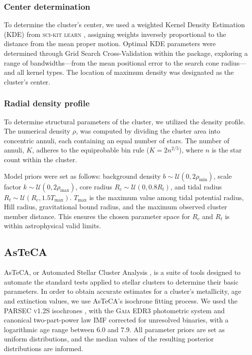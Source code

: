 \documentclass[baaa]{baaa}
\begin{document}
\subsubsection{Center determination}

To  determine the cluster's center, we used a weighted Kernel Density Estimation (KDE) from \textsc{sci-kit learn} \citep{scikit-learn}, assigning weights inversely proportional to the distance from the mean proper motion. Optimal KDE parameters were determined through Grid Search Cross-Validation within the package, exploring a range of bandwidths—from the mean positional error to the search cone radius—and all kernel types. The location of maximum density was designated as the cluster's center.

\subsubsection{Radial density profile}

To determine structural parameters of the cluster, we utilized the \citet{1962AJ.....67..471K} density profile. The numerical density $\rho$, was computed by dividing the cluster area into concentric annuli, each containing an equal number of stars. The number of annuli, $K$, adheres to the equiprobable bin rule ($K = 2n^{2/5}$), where $n$ is the star count within the cluster.

Model priors were set as follows: background density $b \sim \mathcal{U}(0, 2\rho_{\mathrm{min}})$, scale factor $k \sim \mathcal{U}(0, 2\rho_{\mathrm{max}})$, core radius $R_c \sim \mathcal{U}(0, 0.8R_t)$, and tidal radius $R_t \sim \mathcal{U}(R_c, 1.5T_{\mathrm{max}})$. $T_{\mathrm{max}}$ is the maximum value among tidal potential radius, Hill radius, gravitational bound radius, and the maximum observed cluster member distance. This ensures the chosen parameter space for $R_c$ and $R_t$ is within astrophysical valid limits.

\subsection{AsTeCA}

AsTeCA, or Automated Stellar Cluster Analysis \citep{2015A&A...576A...6P}, is a suite of tools designed to automate the standard tests applied to stellar clusters to determine their basic parameters. In order to obtain accurate estimates for a cluster's metallicity, age and extinction values, we use AsTeCA's isochrone fitting process. We used the \textsc{PARSEC v1.2S} isochrones \citep{2012MNRAS.427..127B,2014MNRAS.445.4287T}, with the \textsc{Gaia} EDR3 photometric system and \citet{2001MNRAS.322..231K,2002Sci...295...82K} canonical two-part-power law IMF corrected for unresolved binaries, with a logarithmic age range between $6.0$ and $7.9$. All parameter priors are set as uniform distributions, and the median values of the resulting posterior distributions are informed.
\end{document}
